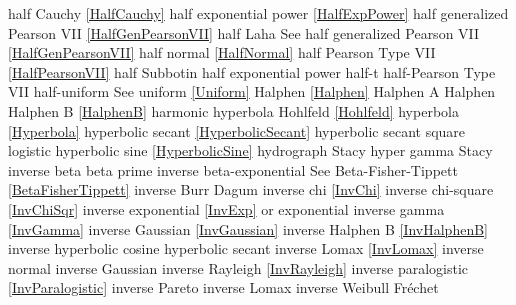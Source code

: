 %
half Cauchy					\dotfill	\eqref{HalfCauchy}					\ncite	%
half exponential power			\dotfill	\eqref{HalfExpPower}				\ncite	%
half generalized Pearson VII		\dotfill	\eqref{HalfGenPearsonVII}			\ncite	%
half Laha						\dotfill	See half generalized Pearson VII \eqref{HalfGenPearsonVII}	\mcite{\self}	%
half normal 					\dotfill	\eqref{HalfNormal}					\ncite	%
half Pearson Type VII			\dotfill	\eqref{HalfPearsonVII} 				\ncite	%
half Subbotin					\dotfill	half exponential power				\ncite	%
half-t							\dotfill	half-Pearson Type VII				\ncite	%
half-uniform 					\dotfill	See uniform \eqref{Uniform} 			\ncite	%
Halphen						\dotfill	\eqref{Halphen}						\ncite
Halphen A						\dotfill	Halphen							\ncite
Halphen B						\dotfill	\eqref{HalphenB}					\ncite
harmonic						\dotfill	hyperbola							\ncite
Hohlfeld						\dotfill	\eqref{Hohlfeld}						\mcite{\self}	%
hyperbola						\dotfill	\eqref{Hyperbola}					\ncite	
hyperbolic secant 				\dotfill	\eqref{HyperbolicSecant}				\ncite	%
hyperbolic secant square			\dotfill	logistic 							\ncite	%
hyperbolic sine					\dotfill	\eqref{HyperbolicSine}				\mcite{\self}	%
hydrograph					\dotfill	Stacy 							\ncite	%
hyper gamma   					\dotfill	Stacy							\ncite	%
%
inverse beta					\dotfill	beta prime 						\ncite	%
inverse beta-exponential 			\dotfill	See Beta-Fisher-Tippett \eqref{BetaFisherTippett}\ncite
inverse Burr					\dotfill	Dagum 							\ncite	%
inverse chi  					\dotfill	\eqref{InvChi}						\ncite	%
inverse chi-square 				\dotfill	\eqref{InvChiSqr}					\ncite	%
inverse exponential 				\dotfill	\eqref{InvExp} or exponential			\ncite	%
inverse gamma 				\dotfill	\eqref{InvGamma}					\ncite	%
inverse Gaussian				\dotfill	\eqref{InvGaussian}					\ncite	%
inverse Halphen B				\dotfill	\eqref{InvHalphenB}					\ncite	
inverse hyperbolic cosine			\dotfill	hyperbolic secant 					\ncite	%
inverse Lomax					\dotfill	\eqref{InvLomax}					\ncite	%
inverse normal					\dotfill	inverse Gaussian					\ncite	%
inverse Rayleigh  				\dotfill	\eqref{InvRayleigh}					\ncite	%
inverse paralogistic				\dotfill	\eqref{InvParalogistic} 				\ncite	%
inverse Pareto					\dotfill	inverse Lomax 						\ncite 	%
inverse Weibull 				\dotfill	Fr\'{e}chet  						\ncite	%
%
%
